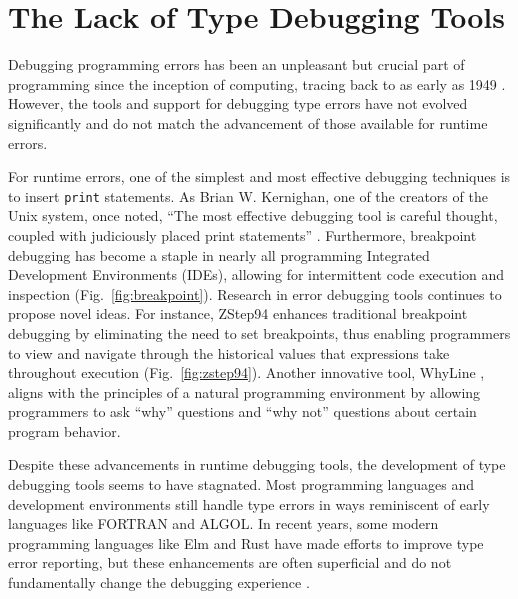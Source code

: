 \section{The Lack of Type Debugging Tools}
\label{sec:debugging-tools}
Debugging programming errors has been an unpleasant but crucial part of programming since the inception of computing, tracing back to as early as 1949 \cite{Campbell-Kelly1992-rn}. However, the tools and support for debugging type errors have not evolved significantly and do not match the advancement of those available for runtime errors.

For runtime errors, one of the simplest and most effective debugging techniques is to insert \texttt{print} statements. As Brian W. Kernighan, one of the creators of the Unix system, once noted, ``The most effective debugging tool is careful thought, coupled with judiciously placed print statements'' \cite{Kernighan1978-xs}. Furthermore, breakpoint debugging has become a staple in nearly all programming Integrated Development Environments (IDEs), allowing for intermittent code execution and inspection (Fig.~\ref{fig:breakpoint}). Research in error debugging tools continues to propose novel ideas. For instance, ZStep94 \cite{Lieberman1995-lg} enhances traditional breakpoint debugging by eliminating the need to set breakpoints, thus enabling programmers to view and navigate through the historical values that expressions take throughout execution (Fig.~\ref{fig:zstep94}). Another innovative tool, WhyLine \cite{Ko2009-uf}, aligns with the principles of a natural programming environment \cite{Myers2004-fy} by allowing programmers to ask ``why'' questions and ``why not'' questions about certain program behavior.

Despite these advancements in runtime debugging tools, the development of type debugging tools seems to have stagnated. Most programming languages and development environments still handle type errors in ways reminiscent of early languages like FORTRAN and ALGOL. In recent years, some modern programming languages like Elm and Rust have made efforts to improve type error reporting, but these enhancements are often superficial and do not fundamentally change the debugging experience \cite{Ferdowsi2023-au}.


